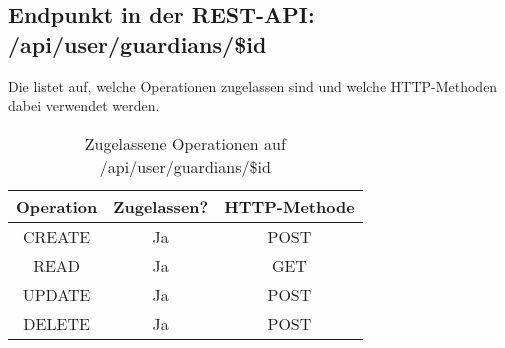 \subsection{Endpunkt in der REST-API: /api/user/guardians/\$id}
Die  listet auf, welche Operationen zugelassen sind und welche HTTP-Methoden dabei verwendet werden. 

\begin{table}[!htbp]
	\begin{tabular}{|c|c|c|}
		\hline
			\textbf{Operation} & \textbf{Zugelassen?} & \textbf{HTTP-Methode} \\ \hline
			CREATE & Ja & POST \\ \hline 
			READ & Ja & GET \\ \hline
			UPDATE & Ja & POST \\ \hline 
			DELETE & Ja & POST \\ \hline
	\end{tabular}

		\caption{Zugelassene Operationen auf /api/user/guardians/\$id}
		\label{tab:end:rest:api:user:guardians:id:meth}
\end{table}